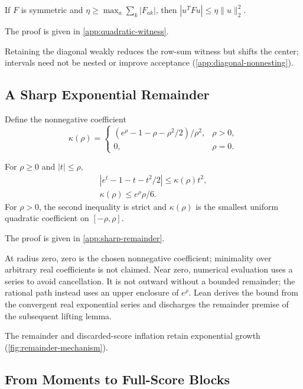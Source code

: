 \begin{lemma}\label{lem:quadratic-witness}
If $F$ is symmetric and $\eta\ge\max_a\sum_k|F_{ak}|$, then
$|u^TFu|\le\eta\|u\|_2^2$.
\end{lemma}
The proof is given in \cref{app:quadratic-witness}.

Retaining the diagonal weakly reduces the row-sum witness but shifts the center;
intervals need not be nested or improve acceptance
(\cref{app:diagonal-nonnesting}).

\subsection{A Sharp Exponential Remainder}

Define the nonnegative coefficient
\begin{equation}
 \kappa(\rho)=
 \begin{cases}
 (e^\rho-1-\rho-\rho^2/2)/\rho^2,&\rho>0,\\
 0,&\rho=0.
 \end{cases}
 \label{eq:kappa}
\end{equation}
\begin{lemma}\label{lem:sharp-remainder}
For $\rho\ge0$ and $|t|\le\rho$,
\begin{equation}
 \begin{gathered}
 |e^t-1-t-t^2/2|\le\kappa(\rho)t^2,\\
 \kappa(\rho)\le e^\rho\rho/6.
 \end{gathered}
 \label{eq:sharp-remainder}
\end{equation}
For $\rho>0$, the second inequality is strict and $\kappa(\rho)$ is the
smallest uniform quadratic coefficient on $[-\rho,\rho]$.
\end{lemma}
The proof is given in \cref{app:sharp-remainder}.

At radius zero, zero is the chosen nonnegative coefficient; minimality over
arbitrary real coefficients is not claimed. Near zero, numerical evaluation
uses a series to avoid cancellation. It is not outward without a bounded
remainder; the rational path instead uses an upper enclosure of $e^\rho$.
Lean derives the bound from the convergent real exponential series and
discharges the remainder premise of the subsequent lifting lemma.

The remainder and discarded-score inflation retain exponential growth
(\cref{fig:remainder-mechanism}).

\subsection{From Moments to Full-Score Blocks}

